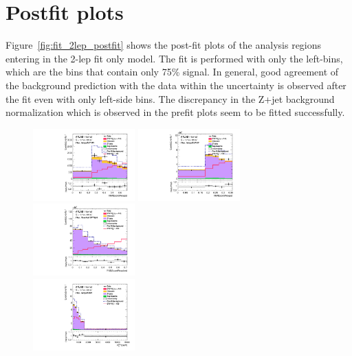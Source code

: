 \section{Postfit plots}
Figure~\ref{fig:fit_2lep_postfit} shows the post-fit plots of the analysis regions entering in the 2-lep fit only model. 
The fit is performed with only the left-bins, which are the bins that contain only 75\% signal.
In general, good agreement of the background prediction with the data within the uncertainty is observed after the fit even with only left-side bins. The discrepancy in the Z+jet background normalization  which is observed in the prefit plots seem to be fitted successfully.

\begin{figure}[ht]
    \centering
    \includegraphics[width=0.35\textwidth]{figures/2lep/FitResults/Region_distRNNScoreMerged_DSRVBSHP_BMin0_J0_incJet1_L2_T0_incFat1_Y6051_incTag1_Fat1_GlobalFit_unconditionnal_mu1.pdf}
    \includegraphics[width=0.35\textwidth]{figures/2lep/FitResults/Region_distRNNScoreMerged_DSRVBSLP_BMin0_J0_incJet1_L2_T0_incFat1_Y6051_incTag1_Fat1_GlobalFit_unconditionnal_mu1.pdf}
    \includegraphics[width=0.35\textwidth]{figures/2lep/FitResults/Region_distRNNScoreResolved_DSRVBSFid_BMin0_T0_Y6051_incTag1_J2_L2_incJet1_GlobalFit_unconditionnal_mu1.pdf}
    \\
    \includegraphics[width=0.35\textwidth]{figures/2lep/FitResults/Region_distMTagMerJets_DCRVjet_BMin0_J0_incJet1_L2_T0_incFat1_Y6051_incTag1_Fat1_GlobalFit_unconditionnal_mu1.pdf}

\end{figure}
